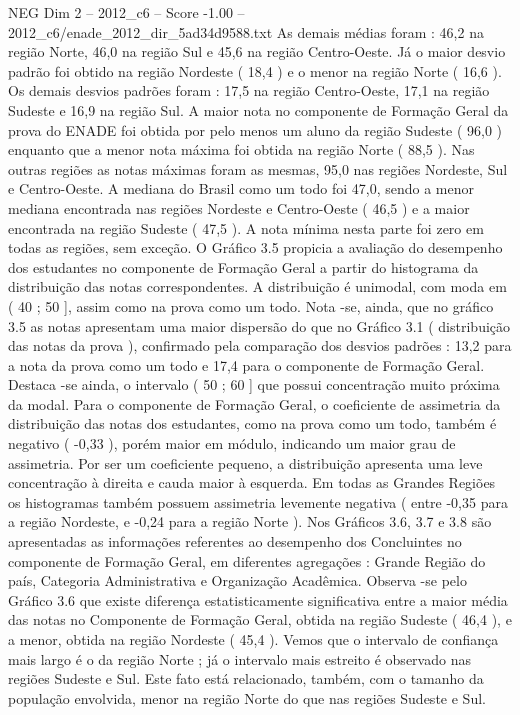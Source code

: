 \begin{textsample}{NEG Dim 2 – 2012\_c6 – Score -1.00 – 2012\_c6/enade\_2012\_dir\_5ad34d9588.txt}
As demais médias foram : 46,2 na região Norte, 46,0 na região Sul e 45,6 na região Centro-Oeste.
Já o maior desvio padrão foi obtido na região Nordeste ( 18,4 ) e o menor na região Norte ( 16,6 ).
Os demais desvios padrões foram : 17,5 na região Centro-Oeste, 17,1 na região Sudeste e 16,9 na região Sul.
A maior nota no componente de Formação Geral da prova do ENADE foi obtida por pelo menos um aluno da região Sudeste ( 96,0 ) enquanto que a menor nota máxima foi obtida na região Norte ( 88,5 ).
Nas outras regiões as notas máximas foram as mesmas, 95,0 nas regiões Nordeste, Sul e Centro-Oeste.
A mediana do Brasil como um todo foi 47,0, sendo a menor mediana encontrada nas regiões Nordeste e Centro-Oeste ( 46,5 ) e a maior encontrada na região Sudeste ( 47,5 ).
A nota mínima nesta parte foi zero em todas as regiões, sem exceção.
O Gráfico 3.5 propicia a avaliação do desempenho dos estudantes no componente de Formação Geral a partir do histograma da distribuição das notas correspondentes.
A distribuição é unimodal, com moda em ( 40 ; 50 ], assim como na prova como um todo.
Nota -se, ainda, que no gráfico 3.5 as notas apresentam uma maior dispersão do que no Gráfico 3.1 ( distribuição das notas da prova ), confirmado pela comparação dos desvios padrões : 13,2 para a nota da prova como um todo e 17,4 para o componente de Formação Geral.
Destaca -se ainda, o intervalo ( 50 ; 60 ] que possui concentração muito próxima da modal.
Para o componente de Formação Geral, o coeficiente de assimetria da distribuição das notas dos estudantes, como na prova como um todo, também é negativo ( -0,33 ), porém maior em módulo, indicando um maior grau de assimetria.
Por ser um coeficiente pequeno, a distribuição apresenta uma leve concentração à direita e cauda maior à esquerda.
Em todas as Grandes Regiões os histogramas também possuem assimetria levemente negativa ( entre -0,35 para a região Nordeste, e -0,24 para a região Norte ).
Nos Gráficos 3.6, 3.7 e 3.8 são apresentadas as informações referentes ao desempenho dos Concluintes no componente de Formação Geral, em diferentes agregações : Grande Região do país, Categoria Administrativa e Organização Acadêmica.
Observa -se pelo Gráfico 3.6 que existe diferença estatisticamente significativa entre a maior média das notas no Componente de Formação Geral, obtida na região Sudeste ( 46,4 ), e a menor, obtida na região Nordeste ( 45,4 ).
Vemos que o intervalo de confiança mais largo é o da região Norte ; já o intervalo mais estreito é observado nas regiões Sudeste e Sul.
Este fato está relacionado, também, com o tamanho da população envolvida, menor na região Norte do que nas regiões Sudeste e Sul.

\end{textsample}
